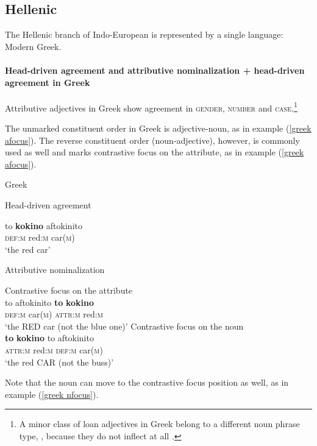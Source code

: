 \subsection{Hellenic}\label{greek synchr}
The Hellenic branch of Indo-European is represented by a single language: Modern Greek. 

\paragraph*{Head\hyp{}driven agreement and attributive nominalization + head\hyp{}driven agreement in Greek}
Attributive adjectives in Greek show agreement in \textsc{gender, number} and \textsc{case}.\footnote{A minor class of loan adjectives in Greek belong to a different noun phrase type, , because they do not inflect at all \citep{ruge1986}.}

The unmarked constituent order in Greek is adjective-noun, as in example (\ref{greek afocus}). The reverse constituent order (noun-adjective), however, is commonly used as well and marks contrastive focus on the attribute, as in example (\ref{greek afocus}).
\begin{exe}
\ex \rm{Greek \citep{ruge1986}}
\begin{xlist}
\label{greek agr}
\ex \rm{Head\hyp{}driven agreement}
\begin{xlist}
\ex
\gll	to			\textbf{kokino} 	aftokinito\\
	\textsc{def:m}	red:\textsc{m}	car(\textsc{m})\\
\glt	‘the red car’
\end{xlist}
\label{greek attr}
\ex \rm{Attributive nominalization}
\begin{xlist}
\label{greek afocus}
\ex \rm{Contrastive focus on the attribute}\\
\gll	to 			aftokinito		\textbf{to}				\textbf{kokino}\\
	\textsc{def:m}	car(\textsc{m})	\textsc{attr:m}	red:\textsc{m}\\
\glt	‘the RED car (not the blue one)’
\label{greek nfocus}
\ex \rm{Contrastive focus on the noun}\\
\gll	\textbf{to}				\textbf{kokino}		to		aftokinito\\
	\textsc{attr:m}	red:\textsc{m}	\textsc{def:m}	car(\textsc{m})\\
\glt	‘the red CAR (not the buss)’
\end{xlist}
\end{xlist}
\end{exe}
Note that the noun can move to the contrastive focus position as well, as in example (\ref{greek nfocus}).

